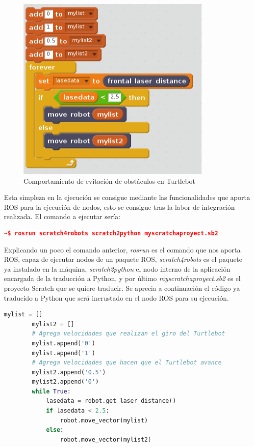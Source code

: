 \begin{figure}[H]
    \centering
    \includegraphics[scale=0.60]{img/robot-obstaculos-scratch.PNG}
  	\caption{Comportamiento de evitación de obstáculos en Turtlebot}
  	\label{fig:turtlebot-scr}
\end{figure}
Esta simpleza en la ejecución se consigue mediante las funcionalidades que aporta ROS para la ejecución de nodos, esto se consigue tras la labor de integración realizada. El comando a ejecutar sería:

\begin{lstlisting}[language=json,firstnumber=1]
~$ rosrun scratch4robots scratch2python myscratchaproyect.sb2
\end{lstlisting}


Explicando un poco el comando anterior, \textit{rosrun} es el comando que nos aporta ROS, capaz de ejecutar nodos de un paquete ROS, \textit{scratch4robots} es el paquete ya instalado en la máquina, \textit{scratch2python} el nodo interno de la aplicación encargada de la traducción a Python, y por último \textit{myscratchaproyect.sb2} es el proyecto Scratch que se quiere traducir. Se aprecia a continuación el código ya traducido a Python que será incrustado en el nodo ROS para su ejecución.

\begin{lstlisting}[language=python,firstnumber=1]
        mylist = []
        mylist2 = []
		# Agrega velocidades que realizan el giro del Turtlebot
        mylist.append('0')
        mylist.append('1')
        # Agrega velocidades que hacen que el Turtlebot avance
        mylist2.append('0.5')
        mylist2.append('0')
        while True:
            lasedata = robot.get_laser_distance()
            if lasedata < 2.5:
                robot.move_vector(mylist)
            else:
                robot.move_vector(mylist2)
                
\end{lstlisting}

